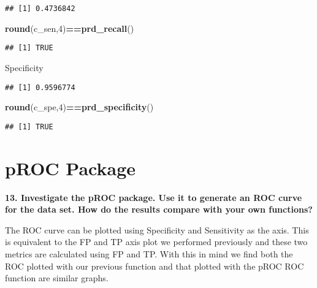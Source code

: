 \documentclass[]{article}
\newenvironment{Shaded}{\begin{snugshade}}{\end{snugshade}}
\newcommand{\DataTypeTok}[1]{\textcolor[rgb]{0.13,0.29,0.53}{#1}}
\newcommand{\DecValTok}[1]{\textcolor[rgb]{0.00,0.00,0.81}{#1}}
\newcommand{\KeywordTok}[1]{\textcolor[rgb]{0.13,0.29,0.53}{\textbf{#1}}}
\newcommand{\NormalTok}[1]{#1}
\newcommand{\OperatorTok}[1]{\textcolor[rgb]{0.81,0.36,0.00}{\textbf{#1}}}
\newcommand{\StringTok}[1]{\textcolor[rgb]{0.31,0.60,0.02}{#1}}
\begin{document}
\begin{verbatim}
## [1] 0.4736842
\end{verbatim}

\begin{Shaded}
\begin{Highlighting}[]
\KeywordTok{round}\NormalTok{(c_sen,}\DecValTok{4}\NormalTok{)}\OperatorTok{==}\KeywordTok{prd_recall}\NormalTok{()}
\end{Highlighting}
\end{Shaded}

\begin{verbatim}
## [1] TRUE
\end{verbatim}

Specificity

\begin{Shaded}
\end{Shaded}

\begin{verbatim}
## [1] 0.9596774
\end{verbatim}

\begin{Shaded}
\begin{Highlighting}[]
\KeywordTok{round}\NormalTok{(c_spe,}\DecValTok{4}\NormalTok{)}\OperatorTok{==}\KeywordTok{prd_specificity}\NormalTok{()}
\end{Highlighting}
\end{Shaded}

\begin{verbatim}
## [1] TRUE
\end{verbatim}

\hypertarget{proc-package}{%
\section{pROC Package}\label{proc-package}}

\textbf{13. Investigate the pROC package. Use it to generate an ROC
curve for the data set. How do the results compare with your own
functions? }

The ROC curve can be plotted using Specificity and Sensitivity as the
axis. This is equivalent to the FP and TP axis plot we performed
previously and these two metrics are calculated using FP and TP. With
this in mind we find both the ROC plotted with our previous function and
that plotted with the pROC ROC function are similar graphs.
\end{document}
